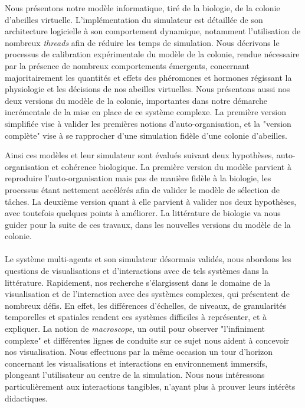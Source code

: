 Nous présentons notre modèle informatique, tiré de la biologie, de la colonie d'abeilles virtuelle. L'implémentation du simulateur est détaillée de son architecture logicielle à son comportement dynamique, notamment l'utilisation de nombreux \textit{threads} afin de réduire les temps de simulation. Nous décrivons le processus de calibration expérimentale du modèle de la colonie, rendue nécessaire par la présence de nombreux comportements émergents, concernant majoritairement les quantités et effets des phéromones et hormones régissant la physiologie et les décisions de nos abeilles virtuelles. Nous présentons aussi nos deux versions du modèle de la colonie, importantes dans notre démarche incrémentale de la mise en place de ce système complexe. La première version simplifiée vise à valider les premières notions d'auto-organisation, et la "version complète" vise à se rapprocher d'une simulation fidèle d'une colonie d'abeilles.

Ainsi ces modèles et leur simulateur sont évalués suivant deux hypothèses, auto-organisation et cohérence biologique. La première version du modèle parvient à reproduire l'auto-organisation mais pas de manière fidèle à la biologie, les processus étant nettement accélérés afin de valider le modèle de sélection de tâches. La deuxième version quant à elle parvient à valider nos deux hypothèses, avec toutefois quelques points à améliorer. La littérature de biologie va nous guider pour la suite de ces travaux, dans les nouvelles versions du modèle de la colonie.

\paragraph{}

Le système multi-agents et son simulateur désormais validés, nous abordons les questions de visualisations et d'interactions avec de tels systèmes dans la littérature. Rapidement, nos recherche s'élargissent dans le domaine de la visualisation et de l'interaction avec des systèmes complexes, qui présentent de nombreux défis. En effet, les différences d'échelles, de niveaux, de granularités temporelles et spatiales rendent ces systèmes difficiles à représenter, et à expliquer. La notion de \textit{macroscope}, un outil pour observer "l'infiniment complexe" et différentes lignes de conduite sur ce sujet nous aident à concevoir nos visualisation. Nous effectuons par la même occasion un tour d'horizon concernant les visualisations et interactions en environnement immersifs, plongeant l'utilisateur au centre de la simulation. Nous nous intéressons particulièrement aux interactions tangibles, n'ayant plus à prouver leurs intérêts didactiques.

